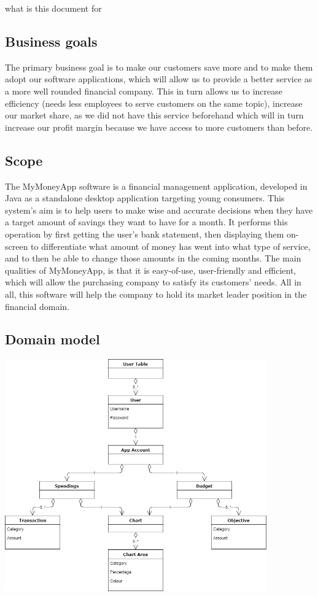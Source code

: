 \documentclass[letterpaper]{article}
\begin{document}
		what is this document for
	
	\subsection{Business goals}
	
		The primary business goal is to make our customers save more and to make them adopt our software applications, which will allow us to provide a better service as a more well rounded financial company. This in turn allows us to increase efficiency (needs less employees to serve customers on the same topic), increase our market share, as we did not have this service beforehand which will in turn increase our profit margin because we have access to more customers than before.
	
	\subsection{Scope}
	
		The MyMoneyApp software is a financial management application, developed in Java as a standalone desktop application targeting young consumers. This system’s aim is to help users to make wise and accurate decisions when they have a target amount of savings they want to have for a month. It performs this operation by first getting the user’s bank statement, then displaying them on-screen to differentiate what amount of money has went into what type of service, and to then be able to change those amounts in the coming months. The main qualities of MyMoneyApp, is that it is easy-of-use, user-friendly and efficient, which will allow the purchasing company to satisfy its customers’ needs. All in all, this software will help the company to hold its market leader position in the financial domain.
	
	\subsection{Domain model}
	
		\begin{center}
			\includegraphics[height=10cm]{DomainModel}
		\end{center}
		
\end{document}
